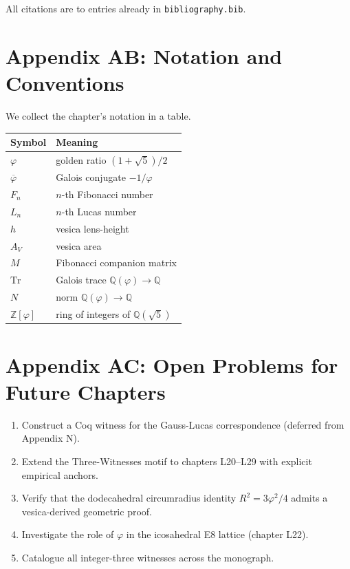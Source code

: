 All citations are to entries already in \texttt{bibliography.bib}.

\section*{Appendix AB: Notation and Conventions}
\label{fa_01:sec:01-app-AB}

We collect the chapter's notation in a table.

\begin{tabular}{|l|l|}
  \hline
  Symbol & Meaning \\
  \hline
  $\varphi$ & golden ratio $(1 + \sqrt 5)/2$ \\
  $\overline{\varphi}$ & Galois conjugate $-1/\varphi$ \\
  $F_n$ & $n$-th Fibonacci number \\
  $L_n$ & $n$-th Lucas number \\
  $h$ & vesica lens-height \\
  $A_V$ & vesica area \\
  $M$ & Fibonacci companion matrix \\
  $\mathrm{Tr}$ & Galois trace $\mathbb{Q}(\varphi) \to \mathbb{Q}$ \\
  $N$ & norm $\mathbb{Q}(\varphi) \to \mathbb{Q}$ \\
  $\mathbb{Z}[\varphi]$ & ring of integers of $\mathbb{Q}(\sqrt 5)$ \\
  \hline
\end{tabular}

\section*{Appendix AC: Open Problems for Future Chapters}
\label{fa_01:sec:01-app-AC}

\begin{enumerate}
  \item Construct a Coq witness for the Gauss-Lucas correspondence
    (deferred from Appendix N).
  \item Extend the Three-Witnesses motif to chapters L20--L29 with
    explicit empirical anchors.
  \item Verify that the dodecahedral circumradius identity $R^2 = 3
    \varphi^2 / 4$ admits a vesica-derived geometric proof.
  \item Investigate the role of $\varphi$ in the icosahedral E8
    lattice (chapter L22).
  \item Catalogue all integer-three witnesses across the monograph.
\end{enumerate}

